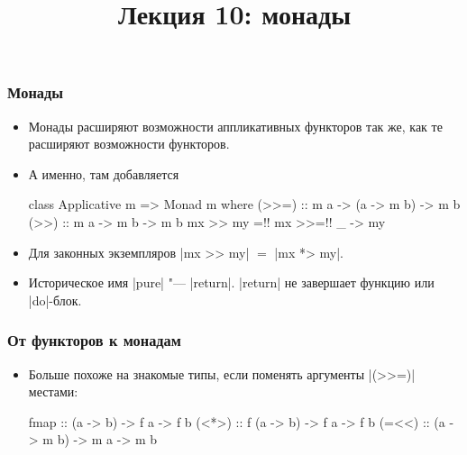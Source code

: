 \documentclass[11pt]{beamer}
\title{Лекция 10: монады}
\begin{document}
\begin{frame}[plain]
  \maketitle
\end{frame}

\begin{frame}[fragile]
  \frametitle{Монады}
  \begin{itemize}
    \item Монады расширяют возможности аппликативных функторов так же, как те расширяют возможности функторов.
    \item А именно, там добавляется
          \begin{haskell}
            class Applicative m => Monad m where
              (>>=) :: m a -> (a -> m b) -> m b
              (>>) :: m a -> m b -> m b
              mx >> my =!\pause! mx >>=!\pause! \_ -> my
          \end{haskell}
          \pause
    \item Для законных экземпляров \haskinline|mx >> my| $=$ \haskinline|mx *> my|.
    \item Историческое имя \haskinline|pure| "--- \haskinline|return|.
          \haskinline|return| не завершает функцию или \haskinline|do|-блок.
  \end{itemize}
\end{frame}

\begin{frame}[fragile]
  \frametitle{От функторов к монадам}
  \begin{itemize}
    \item Больше похоже на знакомые типы, если поменять аргументы \haskinline|(>>=)| местами:
          \begin{haskellsmall}
            fmap  ::   (a -> b) -> f a -> f b
            (<*>) :: f (a -> b) -> f a -> f b
            (=<<) :: (a -> m b) -> m a -> m b
          \end{haskellsmall}
  \end{itemize}
\end{frame}
\end{document}
